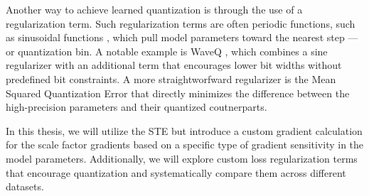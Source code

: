 Another way to achieve learned quantization is through the use of a regularization term. 
Such regularization terms are often periodic functions, 
such as sinusoidal functions \cite{DBLP:journals/corr/abs-1811-09862} \cite{DBLP:journals/corr/abs-1905-01416}, 
which pull model parameters toward the nearest step — or quantization bin.
A notable example is WaveQ \cite{DBLP:journals/corr/abs-2003-00146},
which combines a sine regularizer with an additional term that encourages lower bit widths
without predefined bit constraints. A more straightworfward regularizer is
the Mean Squared Quantization Error \cite{DBLP:journals/access/ChoiEL20}
that directly minimizes the difference between the high-precision parameters
and their quantized coutnerparts.

In this thesis, we will utilize the STE but introduce a custom gradient calculation for the scale factor gradients
based on a specific type of gradient sensitivity in the model parameters.
Additionally, we will explore custom loss regularization terms that encourage quantization
and systematically compare them across different datasets.